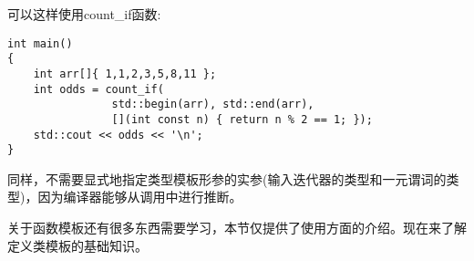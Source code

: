 可以这样使用count\_if函数:

\begin{lstlisting}[style=styleCXX]
int main()
{
	int arr[]{ 1,1,2,3,5,8,11 };
	int odds = count_if(
				std::begin(arr), std::end(arr),
				[](int const n) { return n % 2 == 1; });
	std::cout << odds << '\n';
}
\end{lstlisting}

同样，不需要显式地指定类型模板形参的实参(输入迭代器的类型和一元谓词的类型)，因为编译器能够从调用中进行推断。

关于函数模板还有很多东西需要学习，本节仅提供了使用方面的介绍。现在来了解定义类模板的基础知识。


















